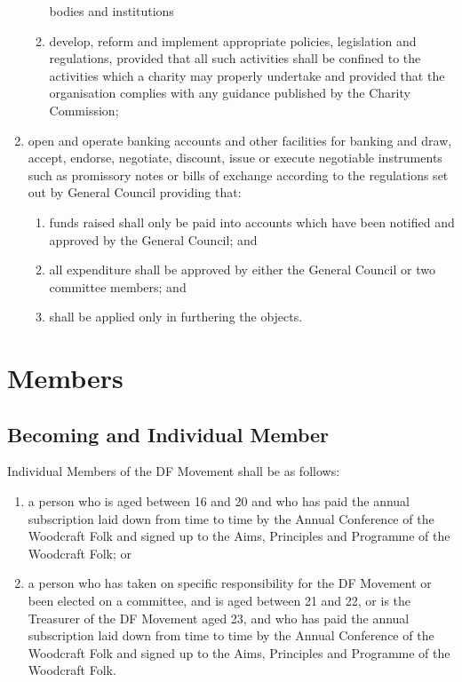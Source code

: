 \documentclass[a4paper, 12pt]{report}
\begin{document}
\begin{enumerate}
\begin{enumerate}
bodies and institutions
\item develop, reform and implement appropriate policies, legislation and regulations, provided that all such activities shall be confined to the activities which a charity may properly undertake and provided that the organisation complies with any guidance published by the Charity Commission;
\end{enumerate}
\item open and operate banking accounts and other facilities for banking and draw,
accept, endorse, negotiate, discount, issue or execute negotiable instruments such
as promissory notes or bills of exchange according to the regulations set out by
General Council providing that:
\begin{enumerate}
\item funds raised shall only be paid into accounts which have been notified and
approved by the General Council; and
\item all expenditure shall be approved by either the General Council or two committee
members; and
\item shall be applied only in furthering the objects.
\end{enumerate}
\end{enumerate}

\section{Members}
\label{sec:members}
\subsection{Becoming and Individual Member}
\label{sec:indivmembers}
Individual Members of the DF Movement shall be as follows:
\begin{enumerate}[\hspace{0.5cm}(a)]
\item \label{item:normalmember} a person who is aged between 16 and 20 and who has paid the annual subscription laid down from time to time by the Annual Conference of the Woodcraft Folk and signed up to the Aims, Principles and Programme of the Woodcraft Folk; or
\item  \label{item:greyarea} a person who has taken on specific responsibility for the DF Movement or been elected on a committee, and is aged between 21 and 22, or is the Treasurer of the DF Movement aged 23, and who has paid the annual subscription laid down from time to time by the Annual Conference of the Woodcraft Folk and signed up to the Aims, Principles and Programme of the Woodcraft Folk.
\end{enumerate}
\end{document}
